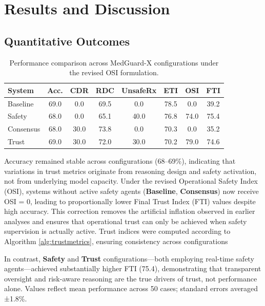 \documentclass[letterpaper]{article} %
\begin{document}
\section{Results and Discussion}
\label{sec:results}

\subsection{Quantitative Outcomes}

\begin{table}[t]
\centering
\caption{Performance comparison across MedGuard-X configurations under the revised OSI formulation.}
\label{tab:results_summary}

\begin{tabular}{lccccccc}
\toprule
System & Acc. & CDR & RDC & UnsafeRx & ETI & OSI & FTI \\
\midrule
Baseline  & 69.0 & 0.0 & 69.5 & 0.0 & 78.5 & 0.0 & 39.2 \\
Safety    & 68.0 & 0.0 & 65.1 & 40.0 & 76.8 & 74.0 & 75.4 \\
Consensus & 68.0 & 30.0 & 73.8 & 0.0 & 70.3 & 0.0 & 35.2 \\
Trust     & 69.0 & 30.0 & 72.0 & 30.0 & 70.2 & 79.0 & 74.6 \\
\bottomrule
\end{tabular}
\end{table}

Accuracy remained stable across configurations (68–69\%), indicating that variations in trust metrics originate from reasoning design and safety activation, not from underlying model capacity.  
Under the revised Operational Safety Index (OSI), systems without active safety agents (\textbf{Baseline}, \textbf{Consensus}) now receive OSI = 0, leading to proportionally lower Final Trust Index (FTI) values despite high accuracy.  
This correction removes the artificial inflation observed in earlier analyses and ensures that operational trust can only be achieved when safety supervision is actually active.
Trust indices were computed according to Algorithm \ref{alg:trustmetrics}, ensuring consistency across configurations

In contrast, \textbf{Safety} and \textbf{Trust} configurations—both employing real-time safety agents—achieved substantially higher FTI (75.4), demonstrating that transparent oversight and risk-aware reasoning are the true drivers of trust, not performance alone. Values reflect mean performance across 50 cases; standard errors averaged ±1.8\%.
\end{document}
